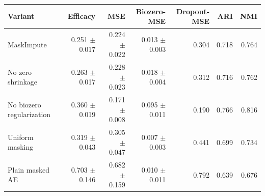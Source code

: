 \begin{tabular}{lrrrrrr}
\toprule
Variant & Efficacy & MSE & Biozero-MSE & Dropout-MSE & ARI & NMI \\
\midrule
MaskImpute & 0.251 $\pm$ 0.017 & 0.224 $\pm$ 0.022 & 0.013 $\pm$ 0.003 & 0.304 & 0.718 & 0.764 \\
No zero shrinkage & 0.263 $\pm$ 0.017 & 0.228 $\pm$ 0.023 & 0.018 $\pm$ 0.004 & 0.312 & 0.716 & 0.762 \\
No biozero regularization & 0.360 $\pm$ 0.019 & 0.171 $\pm$ 0.008 & 0.095 $\pm$ 0.011 & 0.190 & 0.766 & 0.816 \\
Uniform masking & 0.319 $\pm$ 0.043 & 0.305 $\pm$ 0.047 & 0.007 $\pm$ 0.003 & 0.441 & 0.699 & 0.734 \\
Plain masked AE & 0.703 $\pm$ 0.146 & 0.682 $\pm$ 0.159 & 0.010 $\pm$ 0.011 & 0.792 & 0.639 & 0.676 \\
\bottomrule
\end{tabular}
